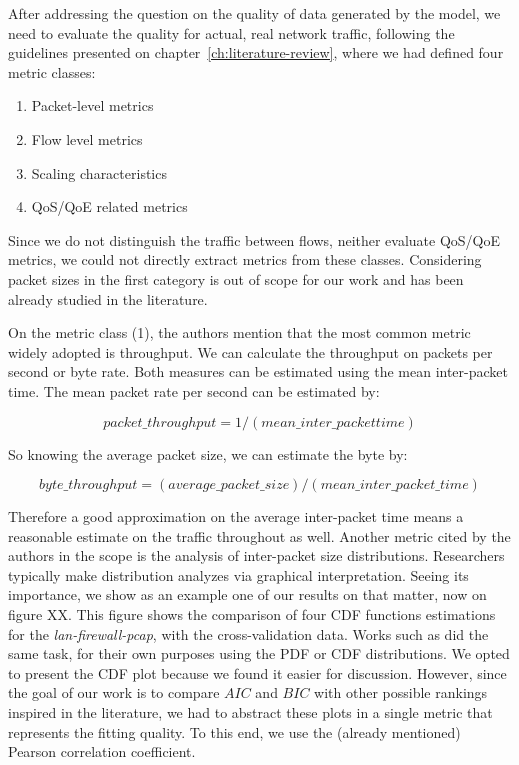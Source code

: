 After addressing the question on the quality of data generated by the model, we need to evaluate the quality for actual, real network traffic, following the guidelines presented on chapter~\ref{ch:literature-review}, where we had defined four metric classes:

\begin{enumerate}
\item  Packet-level metrics
\item  Flow level metrics
\item  Scaling characteristics
\item  QoS/QoE related metrics
\end{enumerate}

Since we do not distinguish the traffic between flows, neither evaluate  QoS/QoE metrics, we could not directly extract metrics from these classes. Considering packet sizes in the first category is out of scope for our work and has been already studied in the literature.

On the metric class (1), the authors mention that the most common metric widely adopted is throughput. We can calculate the throughput on packets per second or byte rate. Both measures can be estimated using the mean inter-packet time.
The mean packet rate per second can be estimated by:

\begin{equation}
\label{eq:pps-mean}
packet\_throughput = 1 / (mean\_inter\_packet time)
\end{equation}

So knowing the average packet size, we can estimate the byte by:

\begin{equation}
\label{eq:th-mean}
byte\_throughput = (average\_packet\_size)/(mean\_inter\_packet\_time)
\end{equation}

Therefore a good approximation on the average inter-packet time means a reasonable estimate on the traffic throughout as well. Another metric cited by the authors in the scope is the analysis of inter-packet size distributions. Researchers typically make distribution analyzes via graphical interpretation. Seeing its importance, we show as an example one of our results on that matter, now on figure XX. This figure shows the comparison of four  CDF functions estimations for the \textit{lan-firewall-pcap}, with the cross-validation data. Works such as \cite{ditg-paper} \cite{sourcesonoff-paper}\cite{do-you-trust}\cite{harpoon-validation}\cite{moongen-paper}\cite{modelling-of-self-similar} did the same task, for their own purposes using the PDF or CDF distributions. We opted to present the CDF plot because we found it easier for discussion. However, since the goal of our work is to compare $AIC$ and $BIC$  with other possible rankings inspired in the literature, we had to abstract these plots in a single metric that represents the fitting quality. To this end, we use the (already mentioned)  Pearson correlation coefficient.

